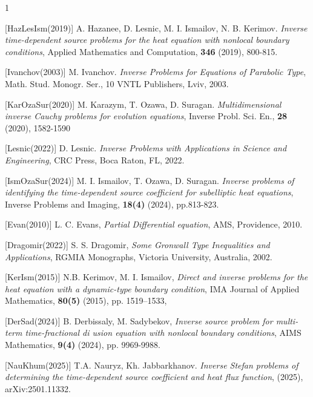 \documentclass[preprint,12pt,authoryear]{elsarticle}
\begin{document}
\begin{thebibliography}{1}
{[HazLesIsm(2019)] A. Hazanee, D. Lesnic, M. I. Ismailov, N. B. Kerimov. \textit{Inverse time-dependent source problems for the heat equation with nonlocal boundary conditions}, Applied Mathematics and Computation, \textbf{346} (2019), 800-815.

[Ivanchov(2003)] M. Ivanchov. \textit{Inverse Problems for Equations of Parabolic Type}, Math. Stud. Monogr. Ser., 10 VNTL Publishers, Lviv, 2003.


[KarOzaSur(2020)] M. Karazym, T. Ozawa, D. Suragan. \textit{Multidimensional inverse Cauchy problems for evolution equations}, Inverse Probl. Sci. En., \textbf{28} (2020), 1582-1590

[Lesnic(2022)] D. Lesnic. \textit{Inverse Problems with Applications in Science and Engineering}, CRC Press, Boca Raton, FL, 2022.

[IsmOzaSur(2024)] M. I. Ismailov, T. Ozawa, D. Suragan. \textit{Inverse problems of identifying the time-dependent source coefficient for subelliptic heat equations}, Inverse Problems and Imaging, \textbf{18(4)} (2024), pp.813-823.

[Evan(2010)] L. C. Evans, \textit{Partial Differential equation}, AMS, Providence, 2010.

[Dragomir(2022)]  S. S. Dragomir, \textit{Some Gronwall Type Inequalities and Applications}, RGMIA Monographs, Victoria University, Australia, 2002.

[KerIsm(2015)] N.B. Kerimov, M. I. Ismailov,  \textit{Direct and inverse problems for the heat equation with a dynamic-type boundary condition}, IMA Journal of Applied Mathematics, \textbf{80(5)} (2015), pp. 1519–1533,

[DerSad(2024)] B. Derbissaly, M. Sadybekov, \textit{ Inverse source problem for multi-term time-fractional di usion equation with nonlocal boundary conditions}, AIMS Mathematics, \textbf{9(4)} (2024), pp. 9969-9988.
}

[NauKhum(2025)] T.A. Nauryz, Kh. Jabbarkhanov. \textit{Inverse Stefan problems of determining the time-dependent source coefficient and heat flux function}, (2025), arXiv:2501.11332.
\end{thebibliography}
\end{document}
